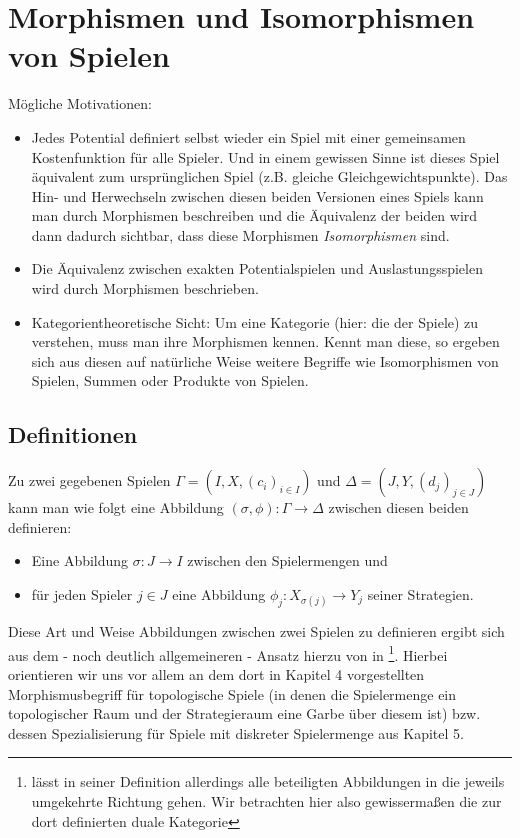 \section[Morphismen]{Morphismen und Isomorphismen von Spielen}\label{sec:Morphismen}


Mögliche Motivationen:
\begin{itemize}
	\item Jedes Potential definiert selbst wieder ein Spiel mit einer gemeinsamen Kostenfunktion für alle Spieler. Und in einem gewissen Sinne ist dieses Spiel \glqq äquivalent\grqq{} zum ursprünglichen Spiel (z.B. gleiche Gleichgewichtspunkte). Das Hin- und Herwechseln zwischen diesen beiden Versionen eines Spiels kann man durch Morphismen beschreiben und die Äquivalenz der beiden wird dann dadurch sichtbar, dass diese Morphismen \emph{Isomorphismen} sind.
	\item Die Äquivalenz zwischen exakten Potentialspielen und Auslastungsspielen wird durch Morphismen beschrieben.
	\item Kategorientheoretische Sicht: Um eine Kategorie (hier: die der Spiele) zu verstehen, muss man ihre Morphismen kennen. Kennt man diese, so ergeben sich aus diesen auf natürliche Weise weitere Begriffe wie Isomorphismen von Spielen, Summen oder Produkte von Spielen.
\end{itemize}


\subsection{Definitionen}

Zu zwei gegebenen Spielen $\Gamma = (I, X, (c_i)_{i\in I})$ und $\Delta = (J, Y, (d_j)_{j\in J})$ kann man wie folgt eine Abbildung $(\sigma, \phi): \Gamma \to \Delta$ zwischen diesen beiden definieren:
\begin{itemize}
	\item Eine Abbildung $\sigma: J \to I$ zwischen den Spielermengen und
	\item für jeden Spieler $j \in J$ eine Abbildung $\phi_j: X_{\sigma(j)} \to Y_j$ seiner Strategien.
\end{itemize}

Diese Art und Weise Abbildungen zwischen zwei Spielen zu definieren ergibt sich aus dem - noch deutlich allgemeineren - Ansatz hierzu von \citeauthor{LapGameCat} in \cite{LapGameCat}\footnote{\citeauthor{LapGameCat} lässt in seiner Definition allerdings alle beteiligten Abbildungen in die jeweils umgekehrte Richtung gehen. Wir betrachten hier also gewissermaßen die zur dort definierten duale Kategorie}. Hierbei orientieren wir uns vor allem an dem dort in Kapitel 4 vorgestellten Morphismusbegriff für topologische Spiele (in denen die Spielermenge ein topologischer Raum und der Strategieraum eine Garbe über diesem ist) bzw. dessen Spezialisierung für Spiele mit diskreter Spielermenge aus Kapitel 5. 

